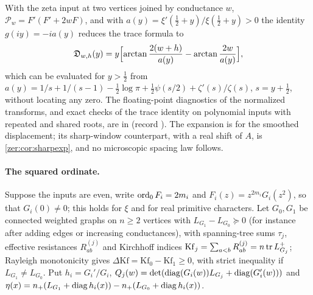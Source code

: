 With the zeta input at two vertices joined by conductance $w$, $\mathcal P_w=F'(F'+2wF)$, and with
$a(y)=\xi'(\tfrac12+y)/\xi(\tfrac12+y)>0$ the identity $g(iy)=-ia(y)$ reduces the trace formula to
\[
 \mathfrak D_{w,h}(y)=y\Bigl[\arctan\frac{2(w+h)}{a(y)}-\arctan\frac{2w}{a(y)}\Bigr],
\]
which can be evaluated for $y>\tfrac12$ from
$a(y)=1/s+1/(s-1)-\tfrac12\log\pi+\tfrac12\psi(s/2)+\zeta'(s)/\zeta(s)$, $s=y+\tfrac12$, without locating
any zero. The floating-point diagnostics of the normalized transforms, and exact checks of the trace
identity on polynomial inputs with repeated and shared roots, are in
 (record
). The expansion is for the
smoothed displacement; its sharp-window counterpart, with a real shift of $A$, is
\cref{zer:cor:sharpexp}, and no microscopic spacing law follows.

\paragraph{The squared ordinate.}
Suppose the inputs are even, write $\operatorname{ord}_0F_i=2m_i$ and $F_i(z)=z^{2m_i}G_i(z^2)$, so that $G_i(0)\ne0$;
this holds for $\xi$ and for real primitive characters. Let $G_0,G_1$ be connected weighted graphs on
$n\ge2$ vertices with $L_{G_1}-L_{G_0}\succeq0$ (for instance after adding edges or increasing
conductances), with spanning-tree sums $\tau_j$, effective resistances $R^{(j)}_{ab}$ and Kirchhoff
indices $\mathrm{Kf}_j=\sum_{a<b}R^{(j)}_{ab}=n\operatorname{tr} L_{G_j}^+$; Rayleigh monotonicity gives
$\Delta\mathrm{Kf}=\mathrm{Kf}_0-\mathrm{Kf}_1\ge0$, with strict inequality if $L_{G_1}\ne L_{G_0}$.
Put $h_i=G_i'/G_i$, $Q_j(w)=\det(\operatorname{diag}(G_i(w))L_{G_j}+\operatorname{diag}(G_i'(w)))$ and
$\eta(x)=n_+(L_{G_1}+\operatorname{diag} h_i(x))-n_+(L_{G_0}+\operatorname{diag} h_i(x))$.

